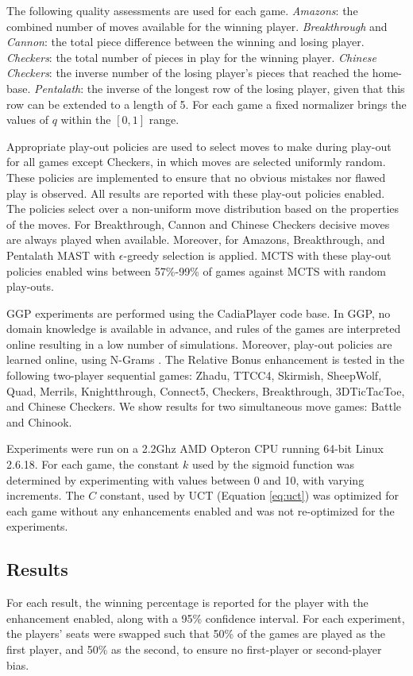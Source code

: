 \documentclass{ecai2014}
\begin{document}
The following quality assessments are used for each game. \emph{Amazons}: the combined number of moves available for the winning player. \emph{Breakthrough} and \emph{Cannon}: the total piece difference between the winning and losing player. \emph{Checkers}: the total number of pieces in play for the winning player. \emph{Chinese Checkers}: the inverse number of the losing player's pieces that reached the home-base. \emph{Pentalath}: the inverse of the longest row of the losing player, given that this row can be extended to a length of 5. For each game a fixed normalizer brings the values of $q$ within the $[0,1]$ range. 

Appropriate play-out policies are used to select moves to make during play-out for all games except Checkers, in which moves are selected uniformly random. These policies are implemented to ensure that no obvious mistakes nor flawed play is observed. All results are reported with these play-out policies enabled. The policies select over a non-uniform move distribution based on the properties of the moves. For Breakthrough, Cannon and Chinese Checkers decisive moves are always played when available. Moreover, for Amazons, Breakthrough, and Pentalath MAST \cite{finnsson2008simulation} with $\epsilon$-greedy selection is applied. MCTS with these play-out policies enabled wins between 57\%-99\% of games against MCTS with random play-outs. 

GGP experiments are performed using the {\sc CadiaPlayer} code base. In GGP, no domain knowledge is available in advance, and rules of the games are interpreted online resulting in a low number of simulations. Moreover, play-out policies are learned online, using N-Grams \cite{Tak2012}. The Relative Bonus enhancement is tested in the following two-player sequential games: Zhadu, TTCC4, Skirmish, SheepWolf, Quad, Merrils, Knightthrough, Connect5, Checkers, Breakthrough, 3DTicTacToe, and Chinese Checkers. We show results for two simultaneous move games: Battle and Chinook.

Experiments were run on a 2.2Ghz AMD Opteron CPU running 64-bit Linux 2.6.18. For each game, the constant $k$ used by the sigmoid function was determined by experimenting with values between 0 and 10, with varying increments. The $C$ constant, used by UCT (Equation \ref{eq:uct}) was optimized for each game without any enhancements enabled and was not re-optimized for the experiments.
\subsection{Results}
\label{subsec:results}
For each result, the winning percentage is reported for the player with the enhancement enabled, along with a 95\% confidence interval. For each experiment, the players' seats were swapped such that 50\% of the games are played as the first player, and 50\% as the second, to ensure no first-player or second-player bias.
\end{document}
